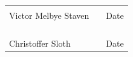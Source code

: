 \documentclass{article}
\begin{document}
\begin{center}
    \vspace{10cm}
    \begin{figure}[b!]
    \begin{tabular}{@{}p{} p{1cm} p{}@{}}
    \hrulefill & & \hrulefill \\
    Victor Melbye Staven & & Date \\ \\ \\ \\
    \hrulefill & & \hrulefill \\
    Christoffer Sloth & & Date \\
    \end{tabular}
    \end{figure}
\end{center}

\clearpage


\newpage
\printbibliography
\end{document}
